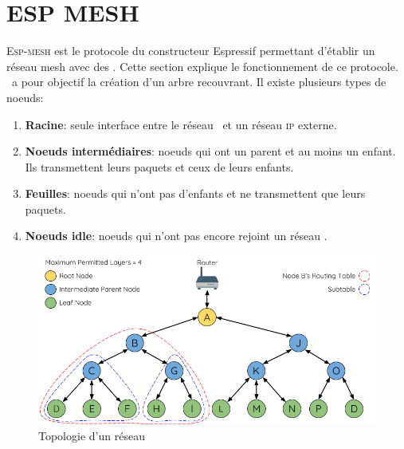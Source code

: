 \chapter{ESP MESH}
        E\textsc{sp-mesh} est le protocole du constructeur Espressif permettant d'établir un réseau mesh avec des \esp.
        Cette section explique le fonctionnement de ce protocole. \espmesh\ a pour objectif la création d'un arbre recouvrant.
        Il existe plusieurs types de noeuds:
        \begin{enumerate}
            \item \textbf{Racine}: seule interface entre le réseau \espmesh\ et un réseau \textsc{ip} externe.
            \item \textbf{Noeuds intermédiaires}: noeuds qui ont un parent et au moins un enfant.
            Ils transmettent leurs paquets et ceux de leurs enfants.
            \item \textbf{Feuilles}: noeuds qui n'ont pas d'enfants et ne transmettent que leurs paquets.
            \item \textbf{Noeuds idle}: noeuds qui n'ont pas encore rejoint un réseau \espmesh.
        \end{enumerate}

        \begin{figure}[H]
            \centering
            \includegraphics[scale=0.3]{images/mesh-node-types.png}
            \caption{Topologie d'un réseau \espmesh \cite{esp-mesh}}
        \end{figure}

